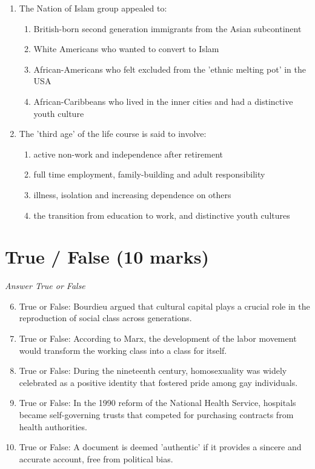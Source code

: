 \documentclass[12pt]{article}
\begin{document}
\begin{enumerate}[label=\arabic*.]
\item The Nation of Islam group appealed to:
\begin{enumerate}[label=(\alph*)]
    \item British-born second generation immigrants from the Asian subcontinent
    \item White Americans who wanted to convert to Islam
    \item African-Americans who felt excluded from the 'ethnic melting pot' in the USA
    \item African-Caribbeans who lived in the inner cities and had a distinctive youth culture
\end{enumerate}
\item The 'third age' of the life course is said to involve:
\begin{enumerate}[label=(\alph*)]
    \item active non-work and independence after retirement
    \item full time employment, family-building and adult responsibility
    \item illness, isolation and increasing dependence on others
    \item the transition from education to work, and distinctive youth cultures
\end{enumerate}
\end{enumerate}

\section*{True / False (10 marks)}
\textit{Answer True or False}
\begin{enumerate}[label=\arabic*.]
\setcounter{enumi}{5}
\item True or False: Bourdieu argued that cultural capital plays a crucial role in the reproduction of social class across generations.
\item True or False: According to Marx, the development of the labor movement would transform the working class into a class for itself.
\item True or False: During the nineteenth century, homosexuality was widely celebrated as a positive identity that fostered pride among gay individuals.
\item True or False: In the 1990 reform of the National Health Service, hospitals became self-governing trusts that competed for purchasing contracts from health authorities.
\item True or False: A document is deemed 'authentic' if it provides a sincere and accurate account, free from political bias.
\end{enumerate}
\end{document}
